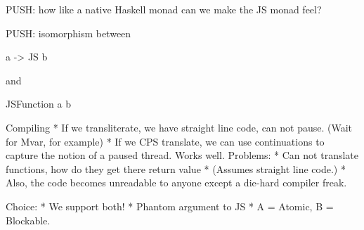 \documentclass{llncs}
\begin{document}
PUSH: how like a native Haskell monad can we make the JS monad feel?

PUSH: isomorphism between 
 
   a -> JS b  

and

   JSFunction a b
 
Compiling
 * If we transliterate, we have straight line code, can not pause.
    (Wait for Mvar, for example)
 * If we CPS translate, we can use continuations to capture the
   notion of a paused thread. Works well.
   Problems:
     * Can not translate functions, how do they get there return value
     * (Assumes straight line code.)
     * Also, the code becomes unreadable to anyone except a die-hard 
       compiler freak.
 
Choice:
 * We support both!
 * Phantom argument to JS
 * A = Atomic, B = Blockable.

%
%
\end{document}
